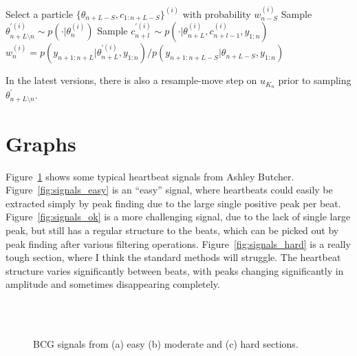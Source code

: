 \documentclass{article}
\begin{document}
\begin{algorithm}
\begin{algorithmic}
      \STATE Select a particle $\{\theta_{n+L-S}, c_{1:n+L-S}\}^{(i)}$ with probability $w_{n-S}^{(i)}$
      \STATE Sample $\theta_{n+L \setminus n}^{'(i)} \sim p(\cdot|\theta_n^{(i)})$
        \STATE Sample $c_{n+l}^{'(i)} \sim p(\cdot|\theta_{n+L}^{(i)}, c_{n+l-1}^{(i)}, y_{1:n})$
      \ENDFOR
      \STATE $w_n^{(i)} = p(y_{n+1:n+L}|\theta_{n+L}^{'(i)}, y_{1:n})/p(y_{n+1:n+L-S}|\theta_{n+L-S}, y_{1:n})$
    \ENDFOR
  \ENDFOR
\end{algorithmic}
\end{algorithm}

In the latest versions, there is also a resample-move step on $u_{K_n}$ prior to sampling $\theta_{n+L \setminus n}^{'}$.



\section{Graphs}

Figure~\ref{fig:signals} shows some typical heartbeat signals from Ashley Butcher. Figure~\ref{fig:signals_easy} is an ``easy'' signal, where heartbeats could easily be extracted simply by peak finding due to the large single positive peak per beat. Figure~\ref{fig:signals_ok} is a more challenging signal, due to the lack of single large peak, but still has a regular structure to the beats, which can be picked out by peak finding after various filtering operations. Figure~\ref{fig:signals_hard} is a really tough section, where I think the standard methods will struggle. The heartbeat structure varies significantly between beats, with peaks changing significantly in amplitude and sometimes disappearing completely.
%
\begin{figure}
\centering
{} \\
 \\
\caption{BCG signals from (a) easy (b) moderate and (c) hard sections.}
\label{fig:signals}
\end{figure}
\end{document}
